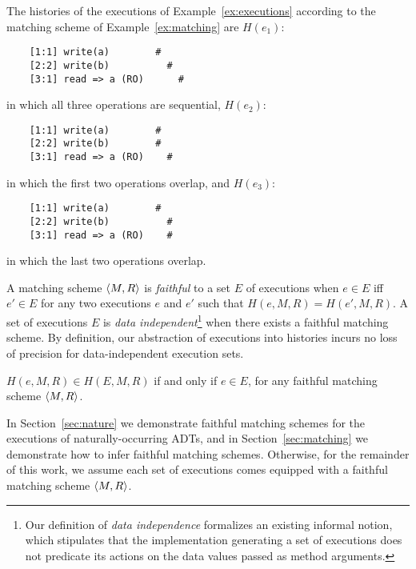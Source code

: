 \begin{example}
  \label{ex:histories-of-executions}

  The histories of the executions of Example~\ref{ex:executions} according to
  the matching scheme of Example~\ref{ex:matching} are $H(e_1)$:
    \vspace{-1mm}
\begin{verbatim}
    [1:1] write(a)        #
    [2:2] write(b)          #
    [3:1] read => a (RO)      #
\end{verbatim}
  \vspace{-1mm}
  in which all three operations are sequential, $H(e_2)$:
    \vspace{-1mm}
\begin{verbatim}
    [1:1] write(a)        #
    [2:2] write(b)        #
    [3:1] read => a (RO)    #
\end{verbatim}
  \vspace{-1mm}
  in which the first two operations overlap, and $H(e_3)$:
    \vspace{-1mm}
\begin{verbatim}
    [1:1] write(a)        #
    [2:2] write(b)          #
    [3:1] read => a (RO)    #
\end{verbatim}
  \vspace{-1mm}
  in which the last two operations overlap.

\end{example}

A matching scheme ${\left\langle{M,R}\right\rangle}$ is \emph{faithful} to a set $E$ of executions
when $e \in E$ if{f} $e' \in E$ for any two executions $e$ and $e'$ such that
$H(e,M,R) = H(e',M,R)$. A set of executions $E$ is \emph{data
independent}\footnote{Our definition of \emph{data independence} formalizes an
existing informal notion, which stipulates that the implementation generating a
set of executions does not predicate its actions on the data values passed as
method arguments.} when there exists a faithful matching scheme. By definition,
our abstraction of executions into histories incurs no loss of precision for
data-independent execution sets.

\begin{lemma}

  $H(e,M,R) \in H(E,M,R)$ if and only if $e \in E$, for any faithful matching
  scheme ${\left\langle{M,R}\right\rangle}$.

\end{lemma}

In Section~\ref{sec:nature} we demonstrate faithful matching schemes for the
executions of naturally-occurring ADTs, and in Section~\ref{sec:matching} we
demonstrate how to infer faithful matching schemes. Otherwise, for the
remainder of this work, we assume each set of executions comes equipped with a
faithful matching scheme ${\left\langle{M,R}\right\rangle}$.

